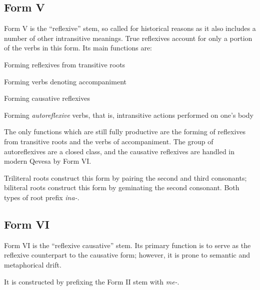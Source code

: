 \documentclass[grammar]{subfiles}
\begin{document}

  \subsection{Form V}
  \label{ssec:dev_verb_form_v}

  Form V is the “reflexive” stem, so called for historical reasons as it also includes a number of other intransitive meanings. True reflexives account for only a portion of the verbs in this form. Its main functions are: 

  \begin{itemize*}
  \item Forming reflexives from transitive roots
  \item Forming verbs denoting accompaniment
  \item Forming causative reflexives
  \item Forming \textit{autoreflexive} verbs, that is, intransitive actions performed on one’s body
  \end{itemize*}

  The only functions which are still fully productive are the forming of reflexives from transitive roots and the verbs of accompaniment. The group of autoreflexives are a closed class, and the causative reflexives are handled in modern Qevesa by Form VI.

  Triliteral roots construct this form by pairing the second and third consonants; biliteral roots construct this form by geminating the second consonant. Both types of root prefix \textit{ina-}.

  \subsection{Form VI}
  \label{ssec:dev_verb_form_vi}

  Form VI is the “reflexive causative” stem. Its primary function is to serve as the reflexive counterpart to the causative form; however, it is prone to semantic and metaphorical drift.

  It is constructed by prefixing the Form II stem with \textit{me-}. 

\end{document}
